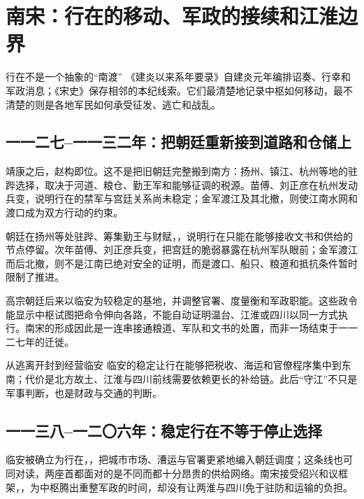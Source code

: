 \section{南宋：行在的移动、军政的接续和江淮边界}

\begin{textwindow}{行在不是一个抽象的“南渡”}
《建炎以来系年要录》自建炎元年编排诏奏、行幸和军政消息；《宋史》保存相邻的本纪线索。它们最清楚地记录中枢如何移动，最不清楚的则是各地军民如何承受征发、逃亡和战乱。
\end{textwindow}

\subsection{一一二七--一一三二年：把朝廷重新接到道路和仓储上}
靖康之后，赵构即位。这不是把旧朝廷完整搬到南方：扬州、镇江、杭州等地的驻跸选择，取决于河道、粮仓、勤王军和能够征调的税源。苗傅、刘正彦在杭州发动兵变，说明行在的禁军与宫廷关系尚未稳定；金军渡江及其北撤，则使江南水网和渡口成为双方行动的约束。

朝廷在扬州等处驻跸、筹集勤王与财赋，，说明行在只能在能够接收文书和供给的节点停留。次年苗傅、刘正彦兵变，把宫廷的脆弱暴露在杭州军队眼前；金军渡江而后北撤，则不是江南已绝对安全的证明，而是渡口、船只、粮道和抵抗条件暂时限制了推进。

高宗朝廷后来以临安为较稳定的基地，并调整官署、度量衡和军政职能。这些政令能显示中枢试图把命令伸向各路，不能自动证明温台、江淮或四川以同一方式执行。南宋的形成因此是一连串接通粮道、军队和文书的处置，而非一场结束于一一二七年的迁徙。

\begin{turningpoint}{从逃离开封到经营临安}
临安的稳定让行在能够把税收、海运和官僚程序集中到东南；代价是北方故土、江淮与四川前线需要依赖更长的补给链。此后“守江”不只是军事判断，也是财政与交通的判断。
\end{turningpoint}

\subsection{一一三八--一二〇六年：稳定行在不等于停止选择}
临安被确立为行在，，把城市市场、漕运与官署更紧地编入朝廷调度；这条线也可同对读，两座首都面对的是不同而都十分昂贵的供给网络。南宋接受绍兴和议框架，，为中枢腾出重整军政的时间，却没有让两淮与四川免于驻防和运输的负担。


